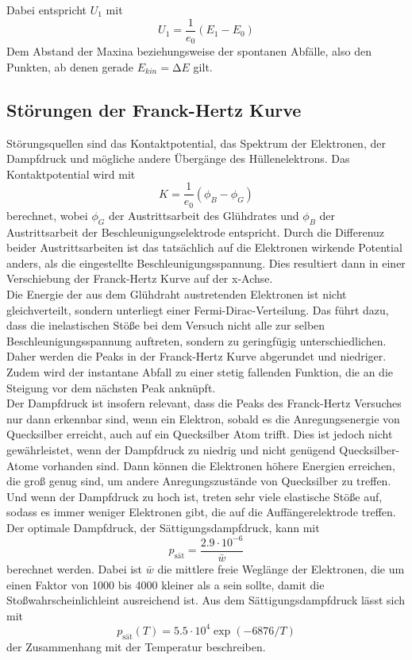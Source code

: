 \noindent Dabei entspricht $U_1$ mit
\begin{equation}
    U_1=\frac{1}{e_0}(E_1-E_0)
    \label{eqn:Abstand}
\end{equation}
\noindent Dem Abstand der Maxina beziehungsweise der spontanen Abfälle, also den Punkten, ab denen gerade $E_{kin}=\increment E$ gilt.

\subsection{Störungen der Franck-Hertz Kurve}
Störungsquellen sind das Kontaktpotential, das Spektrum der Elektronen, der Dampfdruck und mögliche andere Übergänge des Hüllenelektrons.
Das Kontaktpotential wird mit
\begin{equation}
    K=\frac{1}{e_0}(\phi_B-\phi_G)
    \label{eqn:Kontaktpotential}
\end{equation}
berechnet, wobei $\phi_G$ der Austrittsarbeit des Glühdrates und $\phi_B$ der Austrittsarbeit der Beschleunigungselektrode entspricht.
Durch die Differenuz beider Austrittsarbeiten ist das tatsächlich auf die Elektronen wirkende Potential anders, als die eingestellte Beschleunigungsspannung.
Dies resultiert dann in einer Verschiebung der Franck-Hertz Kurve auf der x-Achse.\\
Die Energie der aus dem Glühdraht austretenden Elektronen ist nicht gleichverteilt, sondern unterliegt einer Fermi-Dirac-Verteilung.
Das führt dazu, dass die inelastischen Stöße bei dem Versuch nicht alle zur selben Beschleunigungsspannung auftreten, sondern zu geringfügig unterschiedlichen.
Daher werden die Peaks in der Franck-Hertz Kurve abgerundet und niedriger.
Zudem wird der instantane Abfall zu einer stetig fallenden Funktion, die an die Steigung vor dem nächsten Peak anknüpft.\\
Der Dampfdruck ist insofern relevant, dass die Peaks des Franck-Hertz Versuches nur dann erkennbar sind, wenn ein Elektron, sobald es die Anregungsenergie von Quecksilber erreicht, auch auf ein Quecksilber Atom trifft.
Dies ist jedoch nicht gewährleistet, wenn der Dampfdruck zu niedrig und nicht genügend Quecksilber-Atome vorhanden sind.
Dann können die Elektronen höhere Energien erreichen, die groß genug sind, um andere Anregungszustände von Quecksilber zu treffen.
Und wenn der Dampfdruck zu hoch ist, treten sehr viele elastische Stöße auf, sodass es immer weniger Elektronen gibt, die auf die Auffängerelektrode treffen.
Der optimale Dampfdruck, der Sättigungsdampfdruck, kann mit 
\begin{equation}
   p_{\textrm{sät}} =\frac{2.9\cdot10^{-6}}{\bar{w}}
    \label{eqn:Sättigungsdampfdruck}
\end{equation}
berechnet werden.
Dabei ist $\bar{w}$ die mittlere freie Weglänge der Elektronen, die um einen Faktor von 1000 bis 4000 kleiner als a sein sollte, damit die Stoßwahrscheinlichleint ausreichend ist.
Aus dem Sättigungsdampfdruck lässt sich mit 
\begin{equation}
    p_{\textrm{sät}}(T)=5.5 \cdot 10^4 \exp(-6876/T)
    \label{eqn:Temperatur}
\end{equation}
der Zusammenhang mit der Temperatur beschreiben.

\cite{V601}

